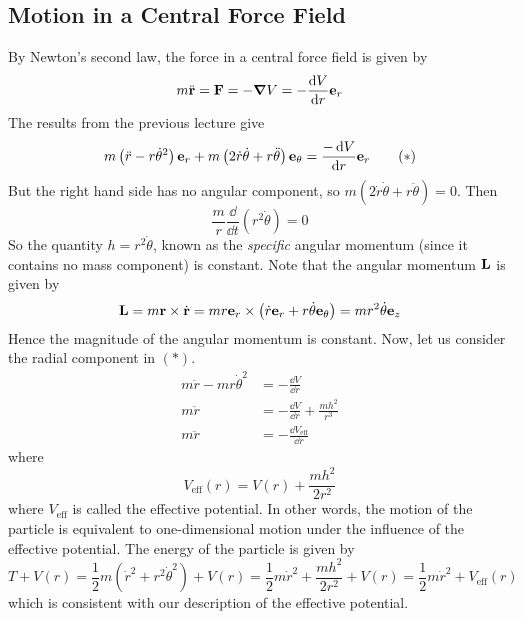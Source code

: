 \subsection{Motion in a Central Force Field}
By Newton's second law, the force in a central force field is given by
\[ m\ddot{\vb r} = \vb F = -\grad V = -\frac{\dd{V}}{\dd{r}} \vb e_r \]
The results from the previous lecture give
\begin{equation}
	m\left(\ddot r - r\dot\theta^2\right) \vb e_r + m\left(2\dot r \dot \theta + r \ddot \theta\right) \vb e_\theta = \frac{-\dd{V}}{\dd{r}} \vb e_r \tag{\(\ast\)}
\end{equation}
But the right hand side has no angular component, so \(m\left(2\dot r \dot \theta + r \ddot \theta\right) = 0\). Then
\[ \frac{m}{r} \frac{\dd}{\dd{t}}\left(r^2 \dot\theta\right) = 0 \]
So the quantity \(h = r^2 \dot\theta\), known as the \textit{specific} angular momentum (since it contains no mass component) is constant. Note that the angular momentum \(\vb L\) is given by
\[ \vb L = m\vb r \times \dot{\vb r} = mr\vb e_r \times \left( \dot r\vb e_r + r\dot\theta \vb e_\theta \right) = mr^2 \dot\theta \vb e_z \]
Hence the magnitude of the angular momentum is constant. Now, let us consider the radial component in \((\ast)\).
\begin{align*}
	m\ddot r - mr\dot\theta^2 & = -\frac{\dd{V}}{\dd{r}}                    \\
	m\ddot r                  & = -\frac{\dd{V}}{\dd{r}} + \frac{mh^2}{r^3} \\
	m\ddot r                  & = -\frac{\dd{V}_\text{eff}}{\dd{r}}
\end{align*}
where
\[ V_\text{eff}(r) = V(r) + \frac{mh^2}{2r^2} \]
where \(V_\text{eff}\) is called the effective potential. In other words, the motion of the particle is equivalent to one-dimensional motion under the influence of the effective potential. The energy of the particle is given by
\[ T + V(r) = \frac{1}{2}m\left( \dot r^2 + r^2 \dot\theta^2 \right) + V(r) = \frac{1}{2}m\dot r^2 + \frac{mh^2}{2r^2} + V(r) = \frac{1}{2}m\dot r^2 + V_\text{eff}(r) \]
which is consistent with our description of the effective potential.

